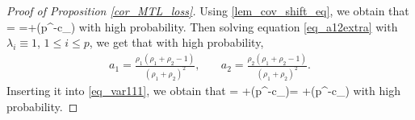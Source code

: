 \begin{proof}[Proof of Proposition \ref{cor_MTL_loss}]
Using \eqref{lem_cov_shift_eq}, we obtain that 
\be\label{eq_var111} = \tr{}=+\OO(p^{-c_\varphi})\ee
with high probability. Then solving equation \eqref{eq_a12extra} with $\lambda_i\equiv 1$, $1\le i\le p$, we get that with high probability,
	\begin{align}
		 a_1 = \frac{\rho_1(\rho_1 + \rho_2 - 1)}{(\rho_1 + \rho_2)^2} ,\quad
		& a_2 = \frac{\rho_2(\rho_1 + \rho_2 - 1)}{(\rho_1 + \rho_2)^2} . \label{simplesovlea12}
			\end{align}
Inserting it into \eqref{eq_var111}, we obtain that 
\be\label{eq_var112} =  \cdot {}+\OO(p^{-c_\varphi})=  +\OO(p^{-c_\varphi})\ee
with high probability. 


\end{proof}
